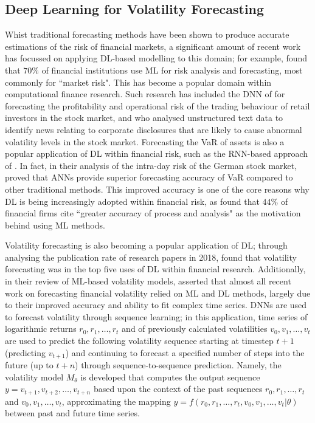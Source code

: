 \documentclass[a4paper, 11pt]{report}
\begin{document}
    \subsection{Deep Learning for Volatility Forecasting}

    Whist traditional forecasting methods have been shown to produce accurate estimations of the risk of financial markets, a significant amount of recent work has focussed on applying DL-based modelling to this domain; for example, \citet{chartis-2019} found that $70\%$ of financial institutions use ML for risk analysis and forecasting, most commonly for ``market risk". This has become a popular domain within computational finance research. Such research has included the DNN of \citet{kim-2020} for forecasting the profitability and operational risk of the trading behaviour of retail investors in the stock market, and \citet{groth-2011} who analysed unstructured text data to identify news relating to corporate disclosures that are likely to cause abnormal volatility levels in the stock market. Forecasting the VaR of assets is also a popular application of DL within financial risk, such as the RNN-based approach of \citet{arimond-2020}. In fact, in their analysis of the intra-day risk of the German stock market, \citet{sun-2009} proved that ANNs provide superior forecasting accuracy of VaR compared to other traditional methods. This improved accuracy is one of the core reasons why DL is being increasingly adopted within financial risk, as \citet{chartis-2019} found that $44\%$ of financial firms cite ``greater accuracy of process and analysis" as the motivation behind using ML methods.

    Volatility forecasting is also becoming a popular application of DL; through analysing the publication rate of research papers in 2018, \citet{sezer-2019} found that volatility forecasting was in the top five uses of DL within financial research. Additionally, in their review of ML-based volatility models, \citet{ge-2022} asserted that almost all recent work on forecasting financial volatility relied on ML and DL methods, largely due to their improved accuracy and ability to fit complex time series. DNNs are used to forecast volatility through sequence learning; in this application, time series of logarithmic returns $r_0, r_1, \dots, r_t$ and of previously calculated volatilities $v_0, v_1, \dots, v_t$ are used to predict the following volatility sequence starting at timestep $t+1$ (predicting $v_{t+1}$) and continuing to forecast a specified number of steps into the future (up to $t+n$) through sequence-to-sequence prediction. Namely, the volatility model $M_{\theta}$ is developed that computes the output sequence $y = v_{t+1}, v_{t+2}, \dots, v_{t+n}$ based upon the context of the past sequences $r_0, r_1, \dots, r_t$ and $v_0, v_1, \dots, v_t$, approximating the mapping $y = f( r_0, r_1, \dots, r_t, v_0, v_1, \dots, v_t \vert \theta )$ between past and future time series.
\end{document}
